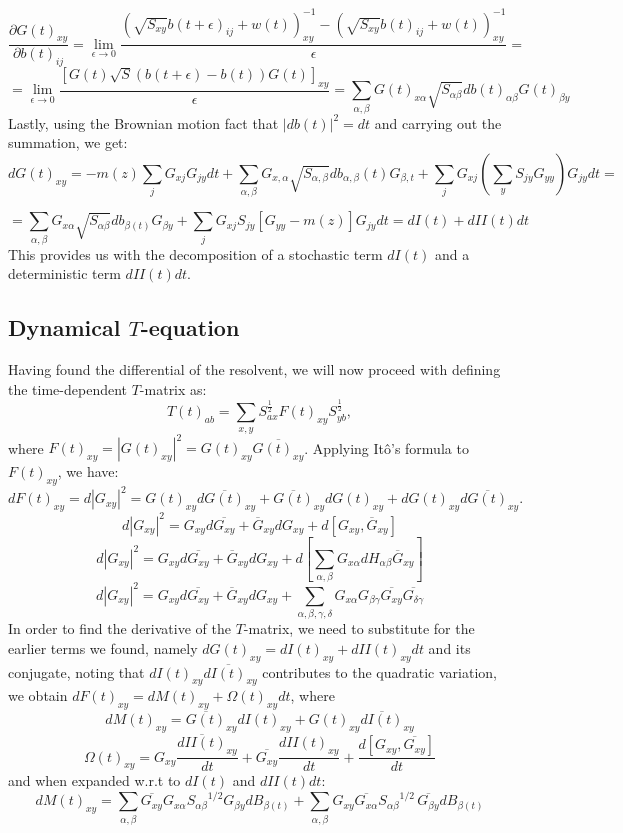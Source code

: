 \documentclass[11pt]{article}
\begin{document}
$$\frac{\partial G(t)_{xy}}{\partial b(t)_{ij}}= \lim_{\epsilon\rightarrow 0}\frac{(\sqrt{S_{xy}}b(t+\epsilon)_{ij}+w(t))^{-1}_{xy}-(\sqrt{S_{xy}}b(t)_{ij}+w(t))^{-1}_{xy}}{\epsilon}=$$
$$ =\lim_{\epsilon\rightarrow 0}\frac{[G(t)\sqrt{S}(b(t+\epsilon)-b(t))G(t)]_{xy}}{\epsilon}=\sum_{\alpha, \beta}G(t)_{x\alpha}\sqrt{S_{\alpha \beta}}db(t)_{\alpha\beta}G(t)_{\beta y}$$
Lastly, using the Brownian motion fact that $|db(t)|^2=dt$ and carrying out the summation, we get:
$$dG(t)_{xy}=-m(z)\sum_j G_{xj}G_{jy}dt+\sum_{\alpha, \beta}G_{x, \alpha}\sqrt{S_{\alpha, \beta}}db_{\alpha, \beta}(t)G_{\beta, t}+\sum_j G_{xj}\left(\sum_yS_{jy}G_{yy}\right)G_{jy}dt=$$


$$=\sum_{\alpha, \beta}G_{x\alpha}\sqrt{S_{\alpha \beta}}db_{\beta(t)}G_{\beta y}+\sum_j G_{xj}S_{jy}\left[G_{yy}-m(z)\right]G_{jy}dt = dI(t) + dII(t)dt$$
This provides us with the decomposition of a stochastic term $dI(t)$ and a deterministic term $dII(t)dt$. 


\subsection{Dynamical $T$-equation}
Having found the differential of the resolvent, we will now proceed with defining the time-dependent $T$-matrix as:
$$T(t)_{ab} = \sum_{x,y}S_{ax}^{\frac{1}{2}}F(t)_{xy}S_{yb}^{\frac{1}{2}},$$
where $F(t)_{xy} = |G(t)_{xy}|^2 = G(t)_{xy}\overline{G(t)_{xy}}$. 
Applying Itô's formula to \( F(t)_{xy} \), we have:
\[
dF(t)_{xy}= d|G_{xy}|^2= G(t)_{xy} d\overline{G(t)}_{xy} + \overline{G(t)}_{xy} dG(t)_{xy} + dG(t)_{xy} d\overline{G(t)}_{xy}.
\]
$$d|G_{xy}|^2 = G_{xy}d\overline{G_{xy}} + \overline{G}_{xy}dG_{xy} + d\left[G_{xy}, \overline{G}_{xy}\right]$$
 $$d|G_{xy}|^2 = G_{xy}d\overline{G_{xy}} + \overline{G}_{xy}dG_{xy} +d\left[\sum_{\alpha, \beta} G_{x\alpha}d H_{\alpha \beta}\overline{G}_{xy}\right]$$
$$d|G_{xy}|^2 = G_{xy}d\overline{G_{xy}} + \overline{G}_{xy}dG_{xy} +\sum_{\alpha,\beta, \gamma, \delta}G_{x\alpha}G_{\beta\gamma}\overline{G_{xy}}\overline{G_{\delta \gamma}}$$
In order to find the derivative of the $T$-matrix, we need to substitute for the earlier terms we found, namely \( dG(t)_{xy} = dI(t)_{xy} + dII(t)_{xy} dt \) and its conjugate, noting that \( dI(t)_{xy} d\overline{I(t)}_{xy} \) contributes to the quadratic variation, we obtain
\(
dF(t)_{xy} = dM(t)_{xy} + \Omega(t)_{xy} dt
\), where
\begin{equation*}
dM(t)_{xy} = \overline{G(t)}_{xy} dI(t)_{xy} + G(t)_{xy} \overline{dI(t)}_{xy} \end{equation*}
\begin{equation*}
\Omega(t)_{xy} = G_{xy}\frac{\overline{dII(t)}_{xy}}{dt}+\overline{G_{xy}}\frac{dII(t)_{xy}}{dt}+\frac{d\left[G_{xy}, \overline{G_{xy}}\right]}{dt}
\end{equation*}
and when expanded w.r.t to $dI(t)$ and $dII(t)dt$:
$$dM(t)_{xy} = \sum_{\alpha, \beta}\overline{G_{xy}}G_{x\alpha}{S_{\alpha\beta}}^{1/2}G_{\beta y}dB_{\beta(t)}+\sum_{\alpha, \beta}{G}_{xy}\overline{G_{x\alpha}}{S_{\alpha\beta}}^{1/2}\,\overline{G_{\beta y}}dB_{\beta(t)}$$
\end{document}
